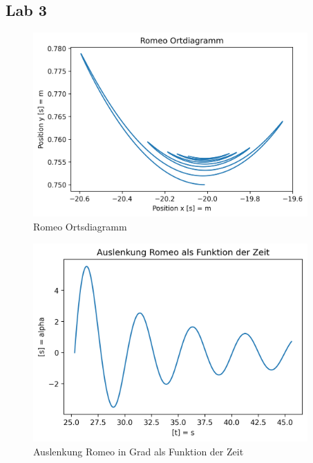 \documentclass[../main.tex]{subfiles}
\begin{document}
    \subsection{Lab 3}

    \begin{figure}[H]
        \begin{center}
            \centerline{\includegraphics[width=105mm]{./images/ropeRomeo/Ortdiagramm}}
            \caption{Romeo Ortsdiagramm}
            \label{fig:RomeoOrtsdiagramm}
        \end{center}
    \end{figure}


    \begin{figure}[H]
        \begin{center}
            \centerline{\includegraphics[width=105mm]{./images/ropeRomeo/AuslenkungDeg}}
            \caption{Auslenkung Romeo in Grad als Funktion der Zeit}
            \label{fig:AuslenkungRomeo}
        \end{center}
    \end{figure}
\end{document}

